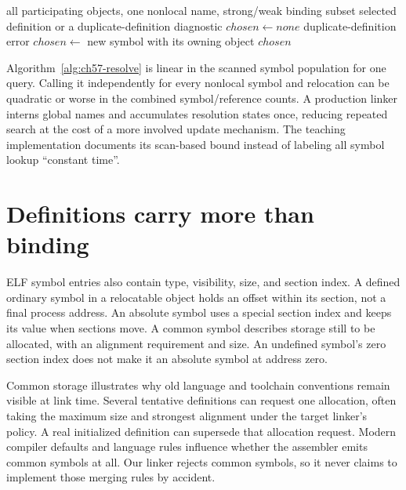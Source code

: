 \begin{algorithm}[htbp]
\caption{Select a definition for one global name in an ordered object set.}
\label{alg:ch57-resolve}
\begin{pseudocode}
\Require all participating objects, one nonlocal name, strong/weak binding subset
\Ensure selected definition or a duplicate-definition diagnostic
\State $chosen\gets none$
    \State \Return duplicate-definition error
  \EndIf
    \State $chosen\gets$ new symbol with its owning object
  \EndIf
\EndFor
\State \Return $chosen$
\end{pseudocode}
\end{algorithm}

Algorithm~\ref{alg:ch57-resolve} is linear in the scanned symbol population for one query.
Calling it independently for every nonlocal symbol and relocation can be quadratic or worse in the combined symbol/reference counts.
A production linker interns global names and accumulates resolution states once, reducing repeated search at the cost of a more involved update mechanism.
The teaching implementation documents its scan-based bound instead of labeling all symbol lookup \enquote{constant time}.

\section{Definitions carry more than binding}
\label{sec:ch57-attributes}

ELF symbol entries also contain type, visibility, size, and section index.
A defined ordinary symbol in a relocatable object holds an offset within its section, not a final process address.
An absolute symbol uses a special section index and keeps its value when sections move.
A common symbol describes storage still to be allocated, with an alignment requirement and size.
An undefined symbol's zero section index does not make it an absolute symbol at address zero.

Common storage illustrates why old language and toolchain conventions remain visible at link time.
Several tentative definitions can request one allocation, often taking the maximum size and strongest alignment under the target linker's policy.
A real initialized definition can supersede that allocation request.
Modern compiler defaults and language rules influence whether the assembler emits common symbols at all.
Our linker rejects common symbols, so it never claims to implement those merging rules by accident.

